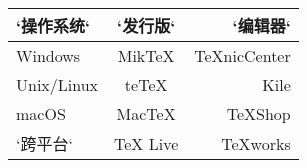 \begin{tabular}{|l|c|r|}
  \hline
  `操作系统`    & `发行版`     & `编辑器` \\
  \hline
  Windows    & MikTeX    & TeXnicCenter \\
  \hline
  Unix/Linux & teTeX     & Kile \\
  \hline
  macOS      & MacTeX    & TeXShop \\
  \hline
  `跨平台`      & TeX Live  & TeXworks \\
  \hline
\end{tabular}
